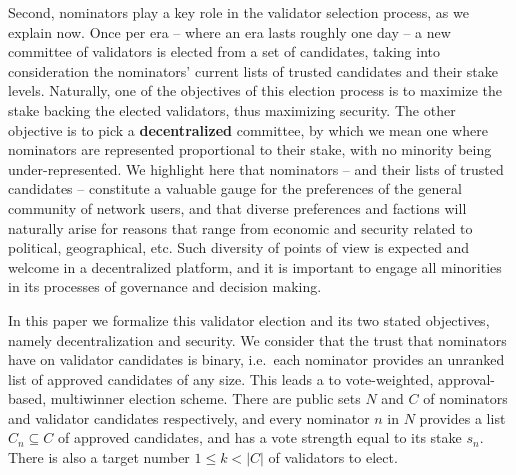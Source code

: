 Second, nominators play a key role in the validator selection process, as we explain now. Once per era -- where an era lasts roughly one day -- a new committee of validators is elected from a set of candidates, taking into consideration the nominators' current lists of trusted candidates and their stake levels. Naturally, one of the objectives of this election process is to maximize the stake backing the elected validators, thus maximizing security. The other objective is to pick a \textbf{decentralized} committee, by which we mean one where nominators are represented proportional to their stake, with no minority being under-represented. 
We highlight here that nominators -- and their lists of trusted candidates -- constitute a valuable gauge for the preferences of the general community of network users, and that diverse preferences and factions will naturally arise for reasons that range from economic and security related to political, geographical, etc. Such diversity of points of view is expected and welcome in a decentralized platform, and it is important to engage all minorities in its processes of governance and decision making. 

In this paper we formalize this validator election and its two stated objectives, namely decentralization and security.
We consider that the trust that nominators have on validator candidates is binary, i.e.~each nominator provides an unranked list of approved candidates of any size. 
This leads a to vote-weighted, approval-based, multiwinner election scheme. 
There are public sets $N$ and $C$ of nominators and validator candidates respectively, and every nominator $n$ in $N$ provides a list $C_n\subseteq C$ of approved candidates, and has a vote strength equal to its stake $s_n$. There is also a target number $1\leq k<|C|$ of validators to elect.


